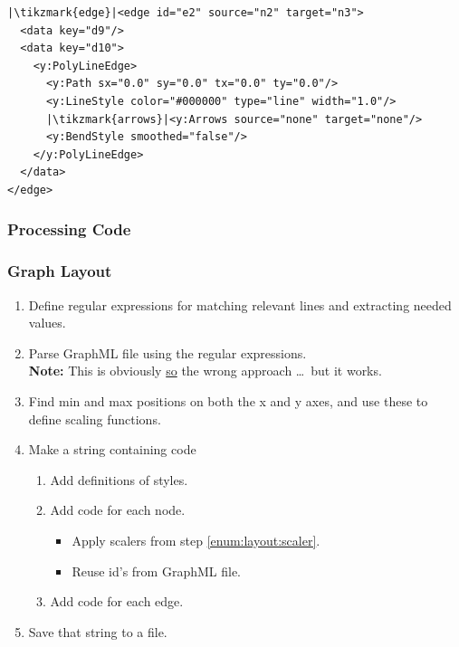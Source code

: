 {\begin{frame}[fragile]
  \begin{verbatim}
|\tikzmark{edge}|<edge id="e2" source="n2" target="n3">
  <data key="d9"/>
  <data key="d10">
    <y:PolyLineEdge>
      <y:Path sx="0.0" sy="0.0" tx="0.0" ty="0.0"/>
      <y:LineStyle color="#000000" type="line" width="1.0"/>
      |\tikzmark{arrows}|<y:Arrows source="none" target="none"/>
      <y:BendStyle smoothed="false"/>
    </y:PolyLineEdge>
  </data>
</edge>
  \end{verbatim}
\end{frame}

\subsubsection{Processing Code}
\begin{frame}[fragile]
  \frametitle{Graph Layout }
  \vspace{3mm}
  \begin{enumerate}
    \item Define regular expressions for matching relevant lines and extracting needed values.
    \item Parse GraphML file using the regular expressions.
          \\
          \textbf{Note:} This is obviously \underline{so} the wrong approach \ldots\ but it works.
    \item \label{enum:layout:scaler} Find min and max positions on both the x and y axes, and use these to define scaling functions.
    \item Make a string containing \TikZ code
      \begin{enumerate}
        \item Add definitions of styles.
        \item Add code for each node.
          \begin{itemize}
            \item Apply scalers from step \ref{enum:layout:scaler}.
            \item Reuse id's from GraphML file.
          \end{itemize}
        \item Add code for each edge.
      \end{enumerate}
    \item Save that string to a file.
  \end{enumerate}
\end{frame}

}
